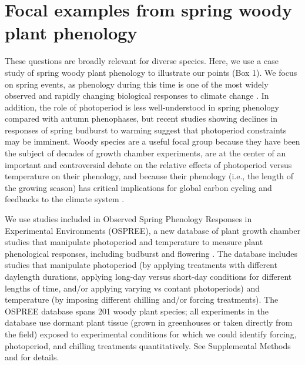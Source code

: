 \documentclass{article}
\begin{document}
\section*{Focal examples from spring woody plant phenology}

\par These questions are broadly relevant for diverse species. Here, we use a case study of spring woody plant phenology to illustrate our points (Box 1). We focus on spring events, as phenology during this time is one of the most widely observed and rapidly changing biological responses to climate change \citep{parmesan2006}. In addition, the role of photoperiod is less well-understood in spring phenology compared with autumn phenophases, but recent studies showing declines in responses of spring budburst to warming \citep[e.g.][]{fu2019,gusewell2017,yu2010} suggest that photoperiod constraints may be imminent. Woody species are a useful focal group because they have been the subject of decades of growth chamber experiments, are at the center of an important and controversial debate on the relative effects of photoperiod versus temperature on their phenology, and because their phenology (i.e., the length of the growing season) has critical implications for global carbon cycling and feedbacks to the climate system \citep{richardson2013}. 
\par We use studies included in Observed Spring Phenology Responses in Experimental Environments (OSPREE), a new database of plant growth chamber studies that manipulate photoperiod and temperature to measure plant phenological responses, including budburst and flowering \citep{wolkovich2019}. The database includes studies that manipulate photoperiod (by applying treatments with different daylength durations, applying long-day versus short-day conditions for different lengths of time, and/or applying varying vs contant photoperiods) and temperature (by imposing different chilling and/or forcing treatments). The OSPREE database spans 201 woody plant species; all experiments in the database use dormant plant tissue (grown in greenhouses or taken directly from the field) exposed to experimental conditions \emph{\citep{wolkovich2019}} for which we could identify forcing, photoperiod, and chilling treatments quantitatively. See Supplemental Methods and \citet{wolkovich2019} for details. 
\end{document}
